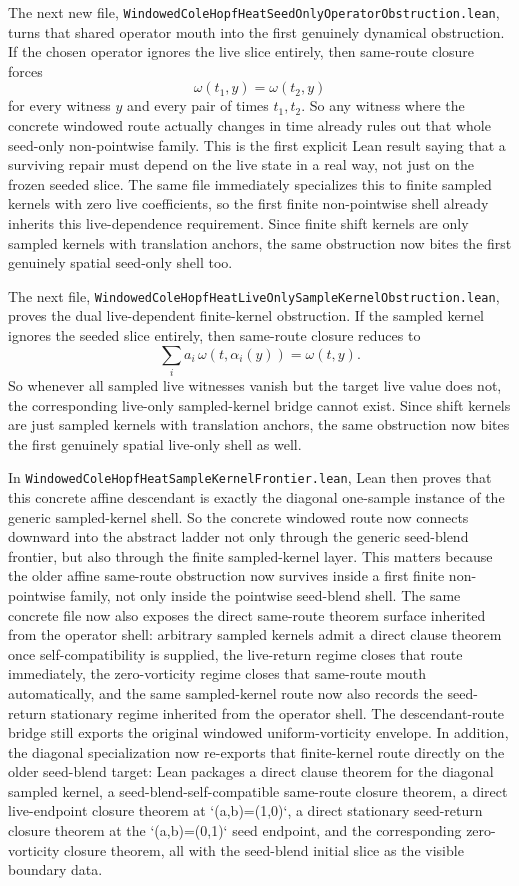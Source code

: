 \documentclass[11pt]{article}
\begin{document}
The next new file,
\texttt{WindowedColeHopfHeatSeedOnlyOperatorObstruction.lean}, turns that shared
operator mouth into the first genuinely dynamical obstruction.  If the chosen
operator ignores the live slice entirely, then same-route closure forces
\[
  \omega(t_1,y)=\omega(t_2,y)
\]
for every witness \(y\) and every pair of times \(t_1,t_2\).  So any witness
where the concrete windowed route actually changes in time already rules out
that whole seed-only non-pointwise family.  This is the first explicit Lean
result saying that a surviving repair must depend on the live state in a real
way, not just on the frozen seeded slice.  The same file immediately specializes
this to finite sampled kernels with zero live coefficients, so the first
finite non-pointwise shell already inherits this live-dependence requirement.
Since finite shift kernels are only sampled kernels with translation anchors,
the same obstruction now bites the first genuinely spatial seed-only shell too.

The next file,
\texttt{WindowedColeHopfHeatLiveOnlySampleKernelObstruction.lean}, proves the
dual live-dependent finite-kernel obstruction.  If the sampled kernel ignores
the seeded slice entirely, then same-route closure reduces to
\[
  \sum_i a_i\,\omega(t,\alpha_i(y))=\omega(t,y).
\]
So whenever all sampled live witnesses vanish but the target live value does
not, the corresponding live-only sampled-kernel bridge cannot exist.  Since
shift kernels are just sampled kernels with translation anchors, the same
obstruction now bites the first genuinely spatial live-only shell as well.

In \texttt{WindowedColeHopfHeatSampleKernelFrontier.lean}, Lean then proves
that this concrete affine descendant is exactly the diagonal one-sample
instance of the generic sampled-kernel shell.  So the concrete windowed route
now connects downward into the abstract ladder not only through the generic
seed-blend frontier, but also through the finite sampled-kernel layer.  This
matters because the older affine same-route obstruction now survives inside a
first finite non-pointwise family, not only inside the pointwise seed-blend
shell.  The same concrete file now also exposes the direct same-route theorem
surface inherited from the operator shell: arbitrary sampled kernels admit a
direct clause theorem once self-compatibility is supplied, the live-return
regime closes that route immediately, the zero-vorticity regime closes that
same-route mouth automatically, and the same sampled-kernel route now also
records the seed-return stationary regime inherited from the operator shell.
The descendant-route bridge still exports the original windowed
uniform-vorticity envelope.  In addition, the diagonal specialization
now re-exports that finite-kernel route
directly on the older seed-blend target: Lean packages a direct clause theorem
for the diagonal sampled kernel, a seed-blend-self-compatible same-route
closure theorem, a direct live-endpoint closure theorem at `(a,b)=(1,0)`, a
direct stationary seed-return closure theorem at the `(a,b)=(0,1)` seed
endpoint, and the corresponding zero-vorticity closure theorem, all with the
seed-blend initial slice as the visible boundary data.
\end{document}
